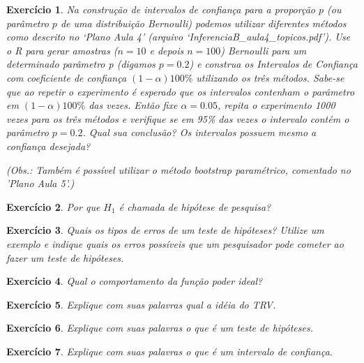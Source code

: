 \documentclass[letter,11pt]{article}
\newtheorem{exer}{Exercício}
\begin{document}
\begin{exer} \rm
Na construção de intervalos de confiança para a proporção $p$ (ou parâmetro $p$ de uma distribuição Bernoulli) podemos utilizar diferentes métodos como descrito no `Plano Aula 4' (arquivo `InferenciaB\_aula4\_topicos.pdf'). Use o R para gerar amostras ($n=10$ e depois $n=100$) Bernoulli para um determinado parâmetro p (digamos $p=0.2$) e construa os Intervalos de Confiança com coeficiente de confiança $(1-\alpha)100\%$ utilizando os três métodos. Sabe-se que ao repetir o experimento é esperado que os intervalos contenham o parâmetro em $(1-\alpha)100\%$ das vezes. Então fixe $\alpha =0.05$, repita o experimento 1000 vezes para os três métodos e verifique se em 95\% das vezes o intervalo contém o parâmetro $p=0.2$. Qual sua conclusão? Os intervalos possuem mesmo a confiança desejada?

\noindent (Obs.: Também é possível utilizar o método \textit{bootstrap} paramétrico, comentado no 'Plano Aula 5'.)
\end{exer}


\begin{exer} \rm
 Por que $H_1$ é chamada de hipótese de pesquisa?
\end{exer}


\begin{exer} \rm
 Quais os tipos de erros de um teste de hipóteses? Utilize um exemplo e indique quais os erros possíveis que um pesquisador pode cometer ao fazer um teste de hipóteses.
\end{exer}


\begin{exer} \rm
 Qual o comportamento da função poder ideal?
\end{exer}


\begin{exer} \rm
 Explique com suas palavras qual a idéia do TRV.
\end{exer}


\begin{exer} \rm
 Explique com suas palavras o que é um teste de hipóteses.
\end{exer}


\begin{exer} \rm
 Explique com suas palavras o que é um intervalo de confiança.
\end{exer}
\end{document}
